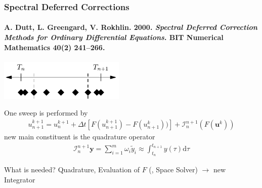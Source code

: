 \documentclass[%
  english,
  hyperref={pdfpagelabels=false},
  aspectratio=1610]{beamer}
\begin{document}
\begin{frame}
  \frametitle{ Spectral Deferred Corrections }
  \framesubtitle{
    \normalfont\tiny%
    A. Dutt, L. Greengard, V. Rokhlin. 2000. \emph{Spectral Deferred Correction Methods for Ordinary Differential Equations}. BIT Numerical Mathematics 40(2) 241–266.%
  }
  \begin{center}
    \includegraphics[width=6cm]{src/sdc_time_domain} 
  \end{center}

  One sweep is performed by
  \begin{align*}
    u_{n+1}^{k+1} = u_{n}^{k+1} + \Delta t \left[ F\left( u_{n+1}^{k+1} \right) - F\left(u_{n+1}^{k}  \right)) \right] +\mathcal{I}_{n}^{n+1}\left( F\left( \mathbf{u}^{k} \right) \right) 
  \end{align*}
  new main constituent is the quadrature operator
  \begin{align*}
    \mathcal{I}_{n}^{n+1} \mathbf{y} = \sum_{i=1}^{m} \omega_{i} \tilde y_i \approx \int_{t_n}^{t_{n+1}} y\left( \tau \right) \mathrm{d} \tau
  \end{align*}

  What is needed? \textcolor{fzjyellow}{Quadrature},  \textcolor{fzjyellow}{Evaluation of $F$} (, \textcolor{fzjyellow}{Space Solver}) $\longrightarrow$ \textcolor{fzjyellow}{new Integrator}
\end{frame}
\end{document}
